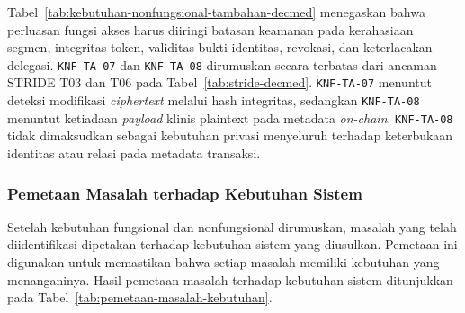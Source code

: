 Tabel~\ref{tab:kebutuhan-nonfungsional-tambahan-decmed} menegaskan bahwa perluasan fungsi akses harus diiringi batasan keamanan pada kerahasiaan segmen, integritas token, validitas bukti identitas, revokasi, dan keterlacakan delegasi. \texttt{KNF-TA-07} dan \texttt{KNF-TA-08} dirumuskan secara terbatas dari ancaman STRIDE T03 dan T06 pada Tabel~\ref{tab:stride-decmed}. \texttt{KNF-TA-07} menuntut deteksi modifikasi \textit{ciphertext} melalui hash integritas, sedangkan \texttt{KNF-TA-08} menuntut ketiadaan \textit{payload} klinis plaintext pada metadata \textit{on-chain}. \texttt{KNF-TA-08} tidak dimaksudkan sebagai kebutuhan privasi menyeluruh terhadap keterbukaan identitas atau relasi pada metadata transaksi.

\subsubsection{Pemetaan Masalah terhadap Kebutuhan Sistem}
\label{subsubsec:pemetaan-masalah-kebutuhan}

Setelah kebutuhan fungsional dan nonfungsional dirumuskan, masalah yang telah diidentifikasi dipetakan terhadap kebutuhan sistem yang diusulkan. Pemetaan ini digunakan untuk memastikan bahwa setiap masalah memiliki kebutuhan yang menanganinya. Hasil pemetaan masalah terhadap kebutuhan sistem ditunjukkan pada Tabel~\ref{tab:pemetaan-masalah-kebutuhan}.

